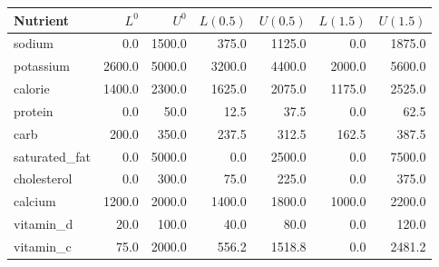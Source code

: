 \begin{tabular}{@{}lrrrrrr@{}}
\toprule
Nutrient & $L^{0}$ & $U^{0}$ & $L(0.5)$ & $U(0.5)$ & $L(1.5)$ & $U(1.5)$ \\
\midrule
sodium & 0.0 & 1500.0 & 375.0 & 1125.0 & 0.0 & 1875.0 \\
potassium & 2600.0 & 5000.0 & 3200.0 & 4400.0 & 2000.0 & 5600.0 \\
calorie & 1400.0 & 2300.0 & 1625.0 & 2075.0 & 1175.0 & 2525.0 \\
protein & 0.0 & 50.0 & 12.5 & 37.5 & 0.0 & 62.5 \\
carb & 200.0 & 350.0 & 237.5 & 312.5 & 162.5 & 387.5 \\
saturated\_fat & 0.0 & 5000.0 & 0.0 & 2500.0 & 0.0 & 7500.0 \\
cholesterol & 0.0 & 300.0 & 75.0 & 225.0 & 0.0 & 375.0 \\
calcium & 1200.0 & 2000.0 & 1400.0 & 1800.0 & 1000.0 & 2200.0 \\
vitamin\_d & 20.0 & 100.0 & 40.0 & 80.0 & 0.0 & 120.0 \\
vitamin\_c & 75.0 & 2000.0 & 556.2 & 1518.8 & 0.0 & 2481.2 \\
\bottomrule
\end{tabular}